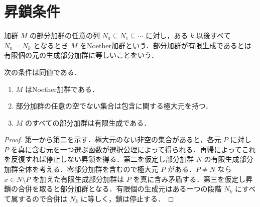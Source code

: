 \section{昇鎖条件}
\begin{defn}[Noether加群]
加群 $M$ の部分加群の任意の列 $N_0\subseteq N_1\subseteq\cdots$ に対し，ある $k$ 以後すべて $N_n=N_k$ となるとき $M$ をNoether加群という．部分加群が有限生成であるとは有限個の元の生成部分加群に等しいことをいう．
\end{defn}
\begin{prop}[Noether性と有限生成性]
次の条件は同値である．
\begin{enumerate}
\item $M$ はNoether加群である．
\item 部分加群の任意の空でない集合は包含に関する極大元を持つ．
\item $M$ のすべての部分加群は有限生成である．
\end{enumerate}
\end{prop}
\begin{proof}
第一から第二を示す．極大元のない非空の集合があると，各元 $P$ に対し $P$ を真に含む元を一つ選ぶ函数が選択公理によって得られる．再帰によってこれを反復すれば停止しない昇鎖を得る．第二を仮定し部分加群 $N$ の有限生成部分加群全体を考える．零部分加群を含むので極大元 $P$ がある．$P\ne N$ なら $x\in N\setminus P$ を加えた有限生成部分加群は $P$ を真に含み矛盾する．第三を仮定し昇鎖の合併を取ると部分加群となる．有限個の生成元はある一つの段階 $N_k$ にすべて属するので合併は $N_k$ に等しく，鎖は停止する．
\end{proof}
